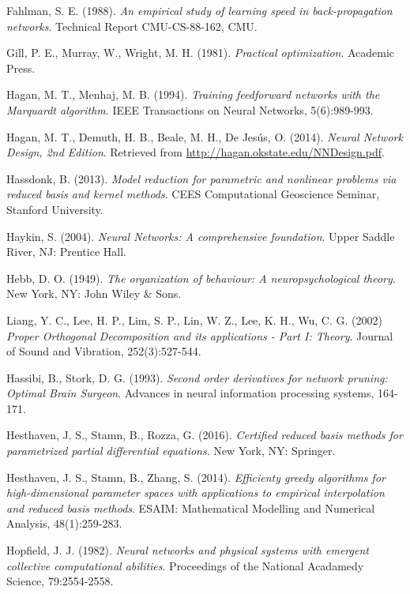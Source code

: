 \documentclass{elsarticle}
\theoremstyle{theorem}
\theoremstyle{definition}
\theoremstyle{remark}
\theoremstyle{proposition}
\numberwithin{figure}{section}
\begin{document}
\begin{thebibliography}{50}
		Fahlman, S. E. (1988). \emph{An empirical study of learning speed in back-propagation networks}. Technical Report CMU-CS-88-162, CMU.
		
		Gill, P. E., Murray, W., Wright, M. H. (1981). \emph{Practical optimization}. Academic Press.
		
		Hagan, M. T., Menhaj, M. B. (1994). \emph{Training feedforward networks with the Marquardt algorithm}. IEEE Transactions on Neural Networks, 5(6):989-993.
		
		Hagan, M. T., Demuth, H. B., Beale, M. H., De Jes\'us, O. (2014). \emph{Neural Network Design, 2nd Edition}. Retrieved from \url{http://hagan.okstate.edu/NNDesign.pdf}.
		
		Hassdonk, B. (2013). \emph{Model reduction for parametric and nonlinear problems via reduced basis and kernel methods}. CEES Computational Geoscience Seminar, Stanford University.
		
		Haykin, S. (2004). \emph{Neural Networks: A comprehensive foundation}. Upper Saddle River, NJ: Prentice Hall.
		
		Hebb, D. O. (1949). \emph{The organization of behaviour: A neuropsychological theory}. New York, NY: John Wiley \& Sons. 
		
		Liang, Y. C., Lee, H. P., Lim, S. P., Lin, W. Z., Lee, K. H., Wu, C. G. (2002) \emph{Proper Orthogonal Decomposition and its applications - Part I: Theory}. Journal of Sound and Vibration, 252(3):527-544.
		
		Hassibi, B., Stork, D. G. (1993). \emph{Second order derivatives for network pruning: Optimal Brain Surgeon}. Advances in neural information processing systems, 164-171.
		
		Hesthaven, J. S., Stamn, B., Rozza, G. (2016). \emph{Certified reduced basis methods for parametrized partial differential equations}. New York, NY: Springer.
		
		Hesthaven, J. S., Stamn, B., Zhang, S. (2014). \emph{Efficienty greedy algorithms for high-dimensional parameter spaces with applications to empirical interpolation and reduced basis methods}. ESAIM: Mathematical Modelling and Numerical Analysis, 48(1):259-283.
		
		Hopfield, J. J. (1982). \emph{Neural networks and physical systems with emergent collective computational abilities}. Proceedings of the National Acadamedy Science, 79:2554-2558.
		

\end{thebibliography}
\end{document}
